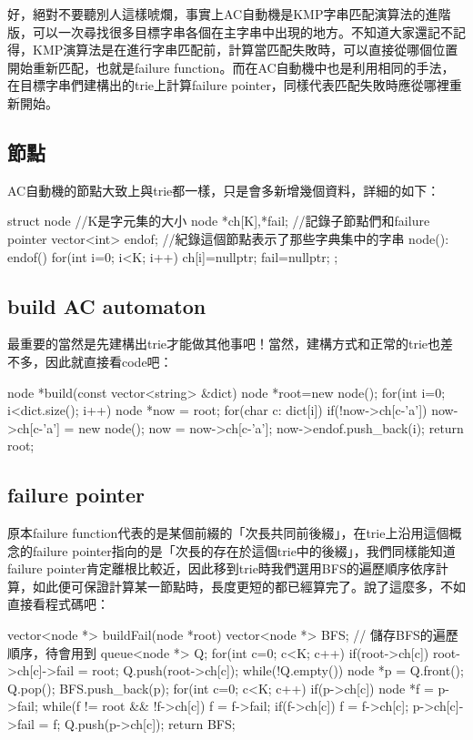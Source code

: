\documentclass[main.tex]{subfiles}
\begin{document}
好，絕對不要聽別人這樣唬爛，事實上AC自動機是KMP字串匹配演算法的進階版，可以一次尋找很多目標字串各個在主字串中出現的地方。不知道大家還記不記得，KMP演算法是在進行字串匹配前，計算當匹配失敗時，可以直接從哪個位置開始重新匹配，也就是failure function。而在AC自動機中也是利用相同的手法，在目標字串們建構出的trie上計算failure pointer，同樣代表匹配失敗時應從哪裡重新開始。
\subsection{節點}
AC自動機的節點大致上與trie都一樣，只是會多新增幾個資料，詳細的如下：
\begin{C++}
struct node{ //K是字元集的大小
	node *ch[K],*fail; //記錄子節點們和failure pointer
	vector<int> endof; //紀錄這個節點表示了那些字典集中的字串
	node(): endof(){
		for(int i=0; i<K; i++) ch[i]=nullptr;
		fail=nullptr;
	}
};
\end{C++}
\subsection{build AC automaton}
最重要的當然是先建構出trie才能做其他事吧！當然，建構方式和正常的trie也差不多，因此就直接看code吧：
\begin{C++}
node *build(const vector<string> &dict) {
    node *root=new node();
    for(int i=0; i<dict.size(); i++) {
		node *now = root;
		for(char c: dict[i]) {
			if(!now->ch[c-'a'])
				now->ch[c-'a'] = new node();
			now = now->ch[c-'a'];
		}
		now->endof.push_back(i);
    }
    return root;
}
\end{C++}
\subsection{failure pointer}
原本failure function代表的是某個前綴的「次長共同前後綴」，在trie上沿用這個概念的failure pointer指向的是「次長的存在於這個trie中的後綴」，我們同樣能知道failure pointer肯定離根比較近，因此移到trie時我們選用BFS的遍歷順序依序計算，如此便可保證計算某一節點時，長度更短的都已經算完了。說了這麼多，不如直接看程式碼吧：
\begin{C++}
vector<node *> buildFail(node *root) {
	vector<node *> BFS; // 儲存BFS的遍歷順序，待會用到
	queue<node *> Q;
	for(int c=0; c<K; c++) {
		if(root->ch[c]) {
			root->ch[c]->fail = root;
			Q.push(root->ch[c]);
		}
	}
	while(!Q.empty()) {
		node *p = Q.front(); Q.pop();
		BFS.push_back(p);
		for(int c=0; c<K; c++) if(p->ch[c]) {
			node *f = p->fail;
			while(f != root && !f->ch[c]) f = f->fail;
			if(f->ch[c]) f = f->ch[c];
			p->ch[c]->fail = f;
			Q.push(p->ch[c]);
		}
	}
	return BFS;
}
\end{C++}
\end{document}
